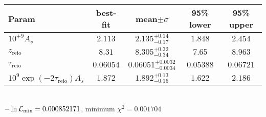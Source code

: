 \begin{tabular}{|l|c|c|c|c|} 
 \hline 
Param & best-fit & mean$\pm\sigma$ & 95\% lower & 95\% upper \\ \hline 
$10^{+9}A_{s }$ &$2.113$ & $2.135_{-0.17}^{+0.14}$ & $1.848$ & $2.454$ \\ 
$z_\mathrm{reio}$ &$8.31$ & $8.305_{-0.34}^{+0.32}$ & $7.65$ & $8.963$ \\ 
$\tau_\mathrm{reio}$ &$0.06054$ & $0.06051_{-0.0034}^{+0.0032}$ & $0.05388$ & $0.06721$ \\ 
$10^9 \exp(-2 \tau_\mathrm{reio}) A_s$ &$1.872$ & $1.892_{-0.16}^{+0.13}$ & $1.622$ & $2.186$ \\ 
\hline 
 \end{tabular} \\ 
$-\ln{\cal L}_\mathrm{min} =0.000852171$, minimum $\chi^2=0.001704$ \\ 
